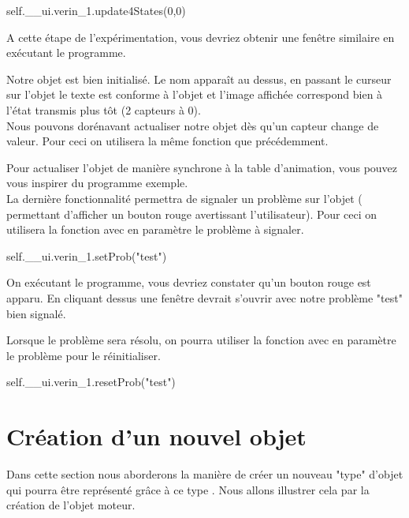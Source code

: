 \documentclass[12pt]{report}    %
\begin{document}
\begin{pyCode}
    self.__ui.verin_1.update4States(0,0)
\end{pyCode}

A cette étape de l'expérimentation, vous devriez obtenir une fenêtre similaire en exécutant le programme.\\


Notre objet est bien initialisé. Le nom apparaît au dessus, en passant le curseur sur l'objet le texte est conforme à l'objet et l'image affichée correspond bien à l'état transmis plus tôt (2 capteurs à 0).\\

Nous pouvons dorénavant actualiser notre objet dès qu'un capteur change de valeur. Pour ceci on utilisera la même fonction que précédemment.


Pour actualiser l'objet de manière synchrone à la table d'animation, vous pouvez vous inspirer du programme exemple.\\

La dernière fonctionnalité permettra de signaler un problème sur l'objet ( permettant d'afficher un bouton rouge avertissant l'utilisateur). Pour ceci on utilisera la fonction  avec en paramètre le problème à signaler.

\begin{pyCode}
    self.__ui.verin_1.setProb("test")
\end{pyCode}

On exécutant le programme, vous devriez constater qu'un bouton rouge est apparu. En cliquant dessus une fenêtre devrait s'ouvrir avec notre problème "test" bien signalé.


Lorsque le problème sera résolu, on pourra utiliser la fonction  avec en paramètre le problème pour le réinitialiser.
\begin{pyCode}
    self.__ui.verin_1.resetProb("test")
\end{pyCode}


\section{Création d'un nouvel objet}

Dans cette section nous aborderons la manière de créer un nouveau "type" d'objet qui pourra être représenté grâce à ce type . Nous allons illustrer cela par la création de l'objet moteur.\\
\end{document}
